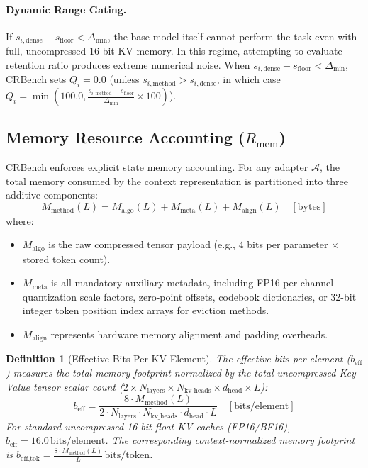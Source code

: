 \documentclass[11pt,a4paper]{article}
\newtheorem{definition}{Definition}
\begin{document}
\paragraph{Dynamic Range Gating.} If $s_{i, \text{dense}} - s_{\text{floor}} < \Delta_{\min}$, the base model itself cannot perform the task even with full, uncompressed 16-bit KV memory. In this regime, attempting to evaluate retention ratio produces extreme numerical noise. When $s_{i, \text{dense}} - s_{\text{floor}} < \Delta_{\min}$, CRBench sets $Q_i = 0.0$ (unless $s_{i, \text{method}} > s_{i, \text{dense}}$, in which case $Q_i = \min(100.0, \frac{s_{i, \text{method}} - s_{\text{floor}}}{\Delta_{\min}} \times 100)$).

\subsection{Memory Resource Accounting ($R_{\text{mem}}$)}
CRBench enforces explicit state memory accounting. For any adapter $\mathcal{A}$, the total memory consumed by the context representation is partitioned into three additive components:
\begin{equation}
\label{eq:memory_decomposition}
\boxed{
M_{\text{method}}(L) = M_{\text{algo}}(L) + M_{\text{meta}}(L) + M_{\text{align}}(L) \quad [\text{bytes}]
}
\end{equation}
where:
\begin{itemize}[leftmargin=*]
    \item $M_{\text{algo}}$ is the raw compressed tensor payload (e.g., 4 bits per parameter $\times$ stored token count).
    \item $M_{\text{meta}}$ is all mandatory auxiliary metadata, including FP16 per-channel quantization scale factors, zero-point offsets, codebook dictionaries, or 32-bit integer token position index arrays for eviction methods.
    \item $M_{\text{align}}$ represents hardware memory alignment and padding overheads.
\end{itemize}

\begin{definition}[Effective Bits Per KV Element]
The effective bits-per-element ($b_{\text{eff}}$) measures the total memory footprint normalized by the total uncompressed Key-Value tensor scalar count ($2 \times N_{\text{layers}} \times N_{\text{kv\_heads}} \times d_{\text{head}} \times L$):
\begin{equation}
\label{eq:beff}
\boxed{
b_{\text{eff}} = \frac{8 \cdot M_{\text{method}}(L)}{2 \cdot N_{\text{layers}} \cdot N_{\text{kv\_heads}} \cdot d_{\text{head}} \cdot L} \quad [\text{bits/element}]
}
\end{equation}
For standard uncompressed 16-bit float KV caches (FP16/BF16), $b_{\text{eff}} = 16.0\,\text{bits/element}$. The corresponding context-normalized memory footprint is $b_{\text{eff,tok}} = \frac{8 \cdot M_{\text{method}}(L)}{L}\,\text{bits/token}$.
\end{definition}
\end{document}
